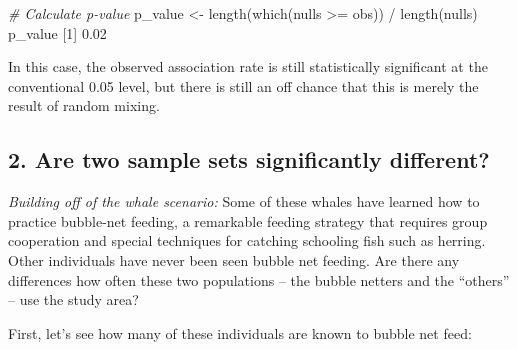 \documentclass[
]{book}
\newenvironment{Shaded}{\begin{snugshade}}{\end{snugshade}}
\newcommand{\CommentTok}[1]{\textcolor[rgb]{0.56,0.35,0.01}{\textit{#1}}}
\newcommand{\DecValTok}[1]{\textcolor[rgb]{0.00,0.00,0.81}{#1}}
\newcommand{\FloatTok}[1]{\textcolor[rgb]{0.00,0.00,0.81}{#1}}
\newcommand{\FunctionTok}[1]{\textcolor[rgb]{0.00,0.00,0.00}{#1}}
\newcommand{\NormalTok}[1]{#1}
\newcommand{\OtherTok}[1]{\textcolor[rgb]{0.56,0.35,0.01}{#1}}
\newcommand{\SpecialCharTok}[1]{\textcolor[rgb]{0.00,0.00,0.00}{#1}}
\newcommand{\StringTok}[1]{\textcolor[rgb]{0.31,0.60,0.02}{#1}}
\begin{document}
\begin{Shaded}
\begin{Highlighting}[]

\CommentTok{\# Calculate p{-}value}
\NormalTok{p\_value }\OtherTok{\textless{}{-}} \FunctionTok{length}\NormalTok{(}\FunctionTok{which}\NormalTok{(nulls }\SpecialCharTok{\textgreater{}=}\NormalTok{ obs)) }\SpecialCharTok{/} \FunctionTok{length}\NormalTok{(nulls)}
\NormalTok{p\_value}
\NormalTok{[}\DecValTok{1}\NormalTok{] }\FloatTok{0.02}
\end{Highlighting}
\end{Shaded}

In this case, the observed association rate is still statistically significant at the conventional 0.05 level, but there is still an off chance that this is merely the result of random mixing.

\hypertarget{are-two-sample-sets-significantly-different}{%
\subsection*{2. Are two sample sets significantly different?}\label{are-two-sample-sets-significantly-different}}

\emph{Building off of the whale scenario:} Some of these whales have learned how to practice bubble-net feeding, a remarkable feeding strategy that requires group cooperation and special techniques for catching schooling fish such as herring. Other individuals have never been seen bubble net feeding. Are there any differences how often these two populations -- the bubble netters and the ``others'' -- use the study area?

First, let's see how many of these individuals are known to bubble net feed:

\begin{Shaded}
\end{Shaded}
\end{document}
